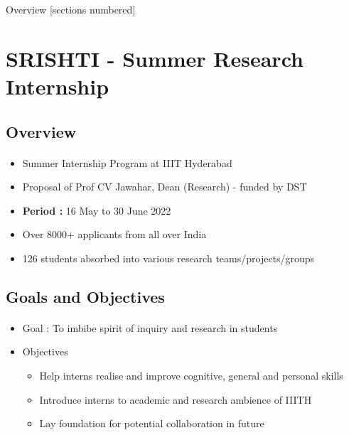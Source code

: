 \titleframe

\begin{frame}{Overview}
  [sections numbered]
  \tableofcontents[hideallsubsections]
\end{frame}



\section{SRISHTI - Summer Research Internship}

\subsection{Overview}
\begin{frame}[fragile=singleslide]{\insertsectionhead}
  \framesubtitle{\insertsubsectionhead}
\begin{center}
\begin{itemize}
\item Summer Internship Program at IIIT Hyderabad
\item Proposal of  Prof CV Jawahar, Dean (Research) - funded by DST
\item \textbf{Period : } 16 May to 30 June 2022
\item Over 8000+ applicants from all over India
\item 126 students absorbed into various research teams/projects/groups
\end{itemize}
\end{center}
\end{frame}


\subsection{Goals and Objectives}
\begin{frame}[fragile=singleslide]{\insertsectionhead}
  \framesubtitle{\insertsubsectionhead}
\begin{center}
\begin{itemize}
\item Goal : To imbibe spirit of inquiry and research in students
\item Objectives
\begin{itemize}
\item Help interns realise and improve cognitive, general and personal skills
\item Introduce interns to academic and research ambience of IIITH
\item Lay foundation for potential collaboration in future
\end{itemize}
\end{itemize}
\end{center}
\end{frame}



